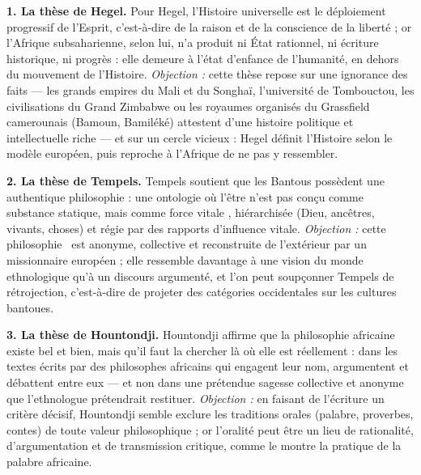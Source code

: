 \documentclass[11pt]{article}
\begin{document}
\begin{corrige}

\textbf{1. La thèse de Hegel.} Pour Hegel, l'Histoire universelle est le déploiement progressif de l'Esprit, c'est-à-dire de la raison et de la conscience de la liberté ; or l'Afrique subsaharienne, selon lui, n'a produit ni État rationnel, ni écriture historique, ni progrès : elle demeure à l'état d'enfance de l'humanité, en dehors du mouvement de l'Histoire. \emph{Objection :} cette thèse repose sur une ignorance des faits — les grands empires du Mali et du Songhaï, l'université de Tombouctou, les civilisations du Grand Zimbabwe ou les royaumes organisés du Grassfield camerounais (Bamoun, Bamiléké) attestent d'une histoire politique et intellectuelle riche — et sur un cercle vicieux : Hegel définit l'Histoire selon le modèle européen, puis reproche à l'Afrique de ne pas y ressembler.

\textbf{2. La thèse de Tempels.} Tempels soutient que les Bantous possèdent une authentique philosophie : une ontologie où l'être n'est pas conçu comme substance statique, mais comme \guillemotleft force vitale \guillemotright, hiérarchisée (Dieu, ancêtres, vivants, choses) et régie par des rapports d'influence vitale. \emph{Objection :} cette \guillemotleft philosophie \guillemotright\ est anonyme, collective et reconstruite de l'extérieur par un missionnaire européen ; elle ressemble davantage à une vision du monde ethnologique qu'à un discours argumenté, et l'on peut soupçonner Tempels de rétrojection, c'est-à-dire de projeter des catégories occidentales sur les cultures bantoues.

\textbf{3. La thèse de Hountondji.} Hountondji affirme que la philosophie africaine existe bel et bien, mais qu'il faut la chercher là où elle est réellement : dans les textes écrits par des philosophes africains qui engagent leur nom, argumentent et débattent entre eux — et non dans une prétendue sagesse collective et anonyme que l'ethnologue prétendrait restituer. \emph{Objection :} en faisant de l'écriture un critère décisif, Hountondji semble exclure les traditions orales (palabre, proverbes, contes) de toute valeur philosophique ; or l'oralité peut être un lieu de rationalité, d'argumentation et de transmission critique, comme le montre la pratique de la palabre africaine.

\end{corrige}
\end{document}
